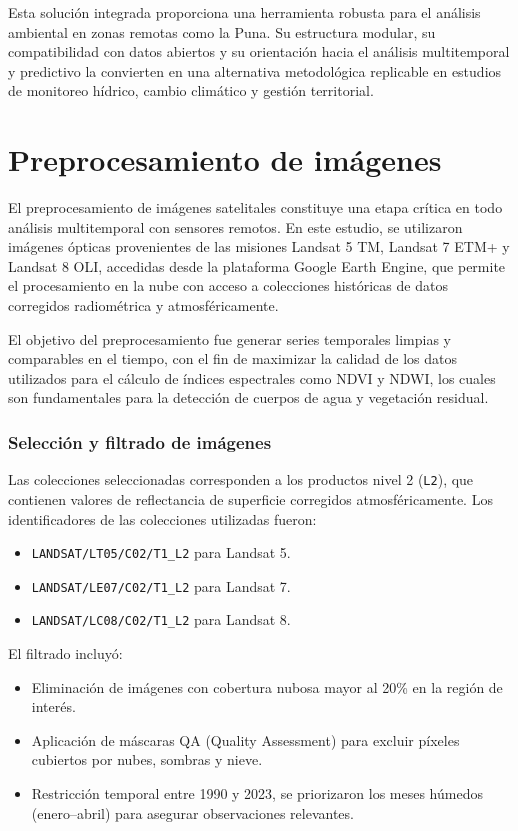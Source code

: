 Esta solución integrada proporciona una herramienta robusta para el análisis ambiental en zonas remotas como la Puna. Su estructura modular, su compatibilidad con datos abiertos y su orientación hacia el análisis multitemporal y predictivo la convierten en una alternativa metodológica replicable en estudios de monitoreo hídrico, cambio climático y gestión territorial.


\section{Preprocesamiento de imágenes}

El preprocesamiento de imágenes satelitales constituye una etapa crítica en todo análisis multitemporal con sensores remotos. En este estudio, se utilizaron imágenes ópticas provenientes de las misiones Landsat 5 TM, Landsat 7 ETM+ y Landsat 8 OLI, accedidas desde la plataforma Google Earth Engine, que permite el procesamiento en la nube con acceso a colecciones históricas de datos corregidos radiométrica y atmosféricamente.

El objetivo del preprocesamiento fue generar series temporales limpias y comparables en el tiempo, con el fin de maximizar la calidad de los datos utilizados para el cálculo de índices espectrales como NDVI y NDWI, los cuales son fundamentales para la detección de cuerpos de agua y vegetación residual. 

\subsubsection*{Selección y filtrado de imágenes}

Las colecciones seleccionadas corresponden a los productos nivel 2 (\texttt{L2}), que contienen valores de reflectancia de superficie corregidos atmosféricamente. Los identificadores de las colecciones utilizadas fueron:

\begin{itemize}
    \item \texttt{LANDSAT/LT05/C02/T1\_L2} para Landsat 5.
    \item \texttt{LANDSAT/LE07/C02/T1\_L2} para Landsat 7.
    \item \texttt{LANDSAT/LC08/C02/T1\_L2} para Landsat 8.
\end{itemize}

El filtrado incluyó:
\begin{itemize}
    \item Eliminación de imágenes con cobertura nubosa mayor al 20\% en la región de interés.
    \item Aplicación de máscaras QA (Quality Assessment) para excluir píxeles cubiertos por nubes, sombras y nieve.
    \item Restricción temporal entre 1990 y 2023, se priorizaron los meses húmedos (enero–abril) para asegurar observaciones relevantes.
\end{itemize}

